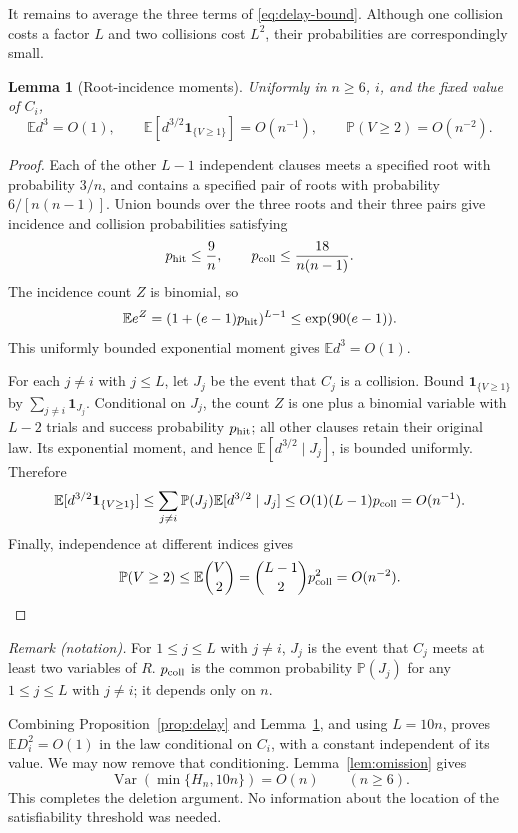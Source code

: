 \documentclass[11pt]{article}
\newtheorem{lemma}[theorem]{Lemma}
\theoremstyle{remark}
\newcommand{\Prb}{\mathbb P}
\newcommand{\E}{\mathbb E}
\newcommand{\Var}{\operatorname{Var}}
\newcommand{\ind}{\mathbf 1}
\numberwithin{equation}{section}
\begin{document}
It remains to average the three terms of \eqref{eq:delay-bound}.
Although one collision costs a factor $L$ and two collisions cost
$L^2$, their probabilities are correspondingly small.

\begin{lemma}[Root-incidence moments]
\label{lem:moments}
Uniformly in $n\ge6$, $i$, and the fixed value of $C_i$,
\begin{equation}
 \E d^3=O(1),\qquad
 \E[d^{3/2}\ind_{\{V\ge1\}}]=O(n^{-1}),\qquad
 \Prb(V\ge2)=O(n^{-2}).
 \label{eq:moments}
\end{equation}
\end{lemma}

\begin{proof}
Each of the other $L-1$ independent clauses meets a specified root
with probability $3/n$, and contains a specified pair of roots with
probability $6/[n(n-1)]$. Union bounds over the three roots and their
three pairs give incidence and collision probabilities satisfying
\[
 p_{\rm hit}\le\frac9n,\qquad
 p_{\rm coll}\le\frac{18}{n(n-1)}.
\]
The incidence count $Z$ is binomial, so
\[
 \E e^Z=(1+(e-1)p_{\rm hit})^{L-1}
      \le\exp(90(e-1)).
\]
This uniformly bounded exponential moment gives $\E d^3=O(1)$.

For each $j\ne i$ with $j\le L$, let $J_j$ be the event that $C_j$
is a collision. Bound $\ind_{\{V\ge1\}}$ by
$\sum_{j\ne i}\ind_{J_j}$. Conditional on $J_j$, the count $Z$ is
one plus a binomial variable with $L-2$ trials and success probability
$p_{\rm hit}$; all other clauses retain their original law.
Its exponential moment, and hence $\E[d^{3/2}\mid J_j]$, is bounded
uniformly. Therefore
\[
 \E[d^{3/2}\ind_{\{V\ge1\}}]
 \le\sum_{j\ne i}\Prb(J_j)\E[d^{3/2}\mid J_j]
 \le O(1)(L-1)p_{\rm coll}=O(n^{-1}).
\]
Finally, independence at different indices gives
\[
 \Prb(V\ge2)\le\E\binom V2
 =\binom{L-1}{2}p_{\rm coll}^2=O(n^{-2}).
\]
\end{proof}

\noindent\textit{Remark (notation).} For $1\le j\le L$ with $j\ne i$, $J_j$ is the event that $C_j$ meets at least two variables of $R$. $p_{\rm coll}$ is the common probability $\Prb(J_j)$ for any $1\le j\le L$ with $j\ne i$; it depends only on $n$.


Combining Proposition~\ref{prop:delay} and Lemma~\ref{lem:moments},
and using $L=10n$, proves $\E D_i^2=O(1)$ in the law conditional
on $C_i$, with a constant independent of its value. We may now remove
that conditioning. Lemma~\ref{lem:omission} gives
\begin{equation}
 \Var(\min\{H_n,10n\})=O(n)\qquad(n\ge6).
 \label{eq:capped}
\end{equation}
This completes the deletion argument. No information about the
location of the satisfiability threshold was needed.
\end{document}
